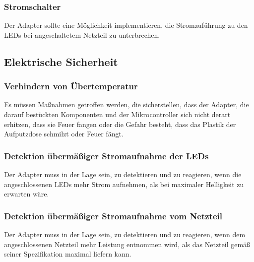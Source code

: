 \subsubsection{Stromschalter}
Der Adapter sollte
eine M\"oglichkeit implementieren,
die Stromzuf\"uhrung zu den LEDs
bei angeschaltetem Netzteil zu unterbrechen.

\newpage
\subsection{Elektrische Sicherheit}
\subsubsection{Verhindern von \"Ubertemperatur}
Es m\"ussen Ma{\ss}nahmen getroffen werden, die sicherstellen,
dass der Adapter,
die darauf best\"uckten Komponenten
und der Mikrocontroller
sich nicht derart erhitzen,
dass sie Feuer fangen oder die Gefahr besteht,
dass das Plastik der Aufputzdose
schmilzt oder Feuer f\"angt.

\subsubsection{Detektion \"uberm\"a{\ss}iger Stromaufnahme der LEDs}
Der Adapter muss in der Lage sein, zu detektieren und zu reagieren,
wenn die angeschlossenen LEDs mehr Strom aufnehmen,
als bei maximaler Helligkeit zu erwarten w\"are.

\subsubsection{Detektion \"uberm\"a{\ss}iger Stromaufnahme vom Netzteil}
Der Adapter muss in der Lage sein, zu detektieren und zu reagieren,
wenn dem angeschlossenen Netzteil mehr Leistung entnommen wird,
als das Netzteil gem\"a{\ss} seiner Spezifikation maximal liefern kann.
